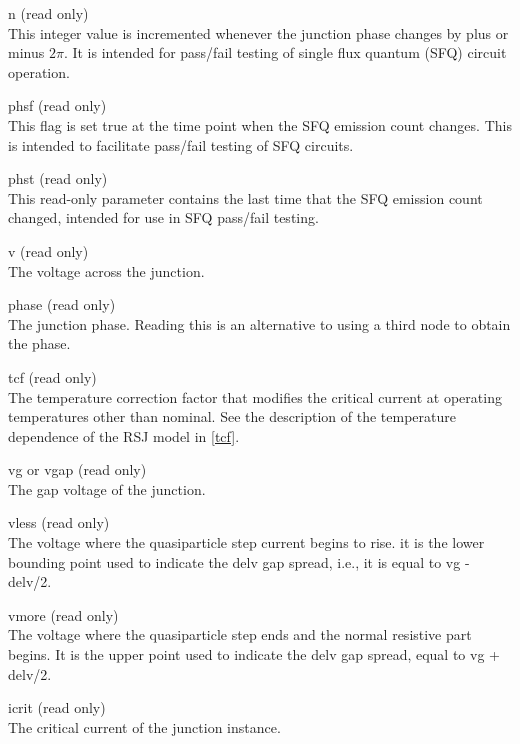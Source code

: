 \begin{description}
\item{\vt n} (read only)\\
This integer value is incremented whenever the junction phase changes
by plus or minus $2\pi$.  It is intended for pass/fail testing of
single flux quantum (SFQ) circuit operation.
 
\item{\vt phsf} (read only)\\
This flag is set true at the time point when the SFQ emission count
changes.  This is intended to facilitate pass/fail testing of SFQ
circuits.

\item{\vt phst} (read only)\\
This read-only parameter contains the last time that the SFQ emission
count changed, intended for use in SFQ pass/fail testing.

\item{\vt v} (read only)\\
The voltage across the junction.

\item{\vt phase} (read only)\\
The junction phase.  Reading this is an alternative to using a third
node to obtain the phase.

\item{tcf} (read only)\\
The temperature correction factor that modifies the critical
current at operating temperatures other than nominal.  See the
description of the temperature dependence of
the RSJ model in \ref{tcf}.

\item{\vt vg} or {\vt vgap} (read only)\\
The gap voltage of the junction.

\item{\vt vless} (read only)\\
The voltage where the quasiparticle step current begins to rise.  it
is the lower bounding point used to indicate the {\vt delv} gap
spread, i.e., it is equal to {\vt vg - delv/2}.

\item{\vt vmore} (read only)\\
The voltage where the quasiparticle step ends and the normal resistive
part begins.  It is the upper point used to indicate the {\vt delv}
gap spread, equal to {\vt vg + delv/2}.

\item{\vt icrit} (read only)\\
The critical current of the junction instance.


\end{description}
